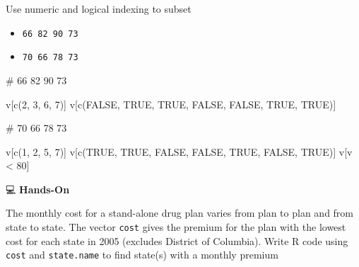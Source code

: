 \documentclass[
  letterpaper,
  DIV=11,
  numbers=noendperiod]{scrreprt}
\newenvironment{Shaded}{\begin{snugshade}}{\end{snugshade}}
\newcommand{\CommentTok}[1]{\textcolor[rgb]{0.37,0.37,0.37}{#1}}
\newcommand{\ConstantTok}[1]{\textcolor[rgb]{0.56,0.35,0.01}{#1}}
\newcommand{\DecValTok}[1]{\textcolor[rgb]{0.68,0.00,0.00}{#1}}
\newcommand{\FunctionTok}[1]{\textcolor[rgb]{0.28,0.35,0.67}{#1}}
\newcommand{\NormalTok}[1]{\textcolor[rgb]{0.00,0.23,0.31}{#1}}
\newcommand{\SpecialCharTok}[1]{\textcolor[rgb]{0.37,0.37,0.37}{#1}}
\begin{document}
Use numeric and logical indexing to subset

\begin{itemize}
\item
  \texttt{66\ 82\ 90\ 73}
\item
  \texttt{70\ 66\ 78\ 73}
\end{itemize}

\begin{tcolorbox}[enhanced jigsaw, colbacktitle=quarto-callout-tip-color!10!white, opacitybacktitle=0.6, breakable, left=2mm, leftrule=.75mm, toprule=.15mm, toptitle=1mm, bottomtitle=1mm, colframe=quarto-callout-tip-color-frame, opacityback=0, coltitle=black, arc=.35mm, titlerule=0mm, colback=white, bottomrule=.15mm, title=\textcolor{quarto-callout-tip-color}{\faLightbulb}\hspace{0.5em}{Answer}, rightrule=.15mm]

\begin{Shaded}
\begin{Highlighting}[]
\CommentTok{\# 66 82 90 73}

\NormalTok{v[}\FunctionTok{c}\NormalTok{(}\DecValTok{2}\NormalTok{, }\DecValTok{3}\NormalTok{, }\DecValTok{6}\NormalTok{, }\DecValTok{7}\NormalTok{)]}
\NormalTok{v[}\FunctionTok{c}\NormalTok{(}\ConstantTok{FALSE}\NormalTok{, }\ConstantTok{TRUE}\NormalTok{, }\ConstantTok{TRUE}\NormalTok{, }\ConstantTok{FALSE}\NormalTok{, }\ConstantTok{FALSE}\NormalTok{, }\ConstantTok{TRUE}\NormalTok{, }\ConstantTok{TRUE}\NormalTok{)]}

\CommentTok{\# 70 66 78 73}

\NormalTok{v[}\FunctionTok{c}\NormalTok{(}\DecValTok{1}\NormalTok{, }\DecValTok{2}\NormalTok{, }\DecValTok{5}\NormalTok{, }\DecValTok{7}\NormalTok{)]}
\NormalTok{v[}\FunctionTok{c}\NormalTok{(}\ConstantTok{TRUE}\NormalTok{, }\ConstantTok{TRUE}\NormalTok{, }\ConstantTok{FALSE}\NormalTok{, }\ConstantTok{FALSE}\NormalTok{, }\ConstantTok{TRUE}\NormalTok{, }\ConstantTok{FALSE}\NormalTok{, }\ConstantTok{TRUE}\NormalTok{)]}
\NormalTok{v[v }\SpecialCharTok{\textless{}} \DecValTok{80}\NormalTok{]}
\end{Highlighting}
\end{Shaded}

\end{tcolorbox}

💻 \textbf{Hands-On}

The monthly cost for a stand-alone drug plan varies from plan to plan
and from state to state. The vector \texttt{cost} gives the premium for
the plan with the lowest cost for each state in 2005 (excludes District
of Columbia). Write R code using \texttt{cost} and \texttt{state.name}
to find state(s) with a monthly premium
\end{document}
